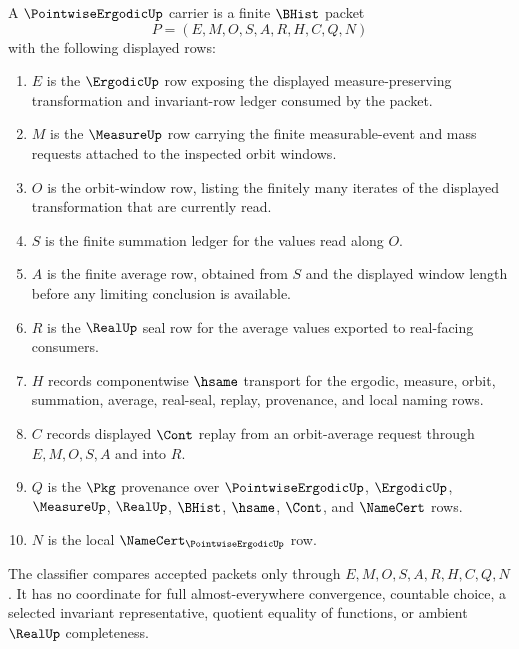 \begin{definition}
\label{def:pointwise-ergodic-carrier}
A $\PointwiseErgodicUp$ carrier is a finite $\BHist$ packet
$$
P=(E,M,O,S,A,R,H,C,Q,N)
$$
with the following displayed rows:
\begin{enumerate}
\item $E$ is the $\ErgodicUp$ row exposing the displayed measure-preserving transformation and invariant-row ledger consumed by the packet.
\item $M$ is the $\MeasureUp$ row carrying the finite measurable-event and mass requests attached to the inspected orbit windows.
\item $O$ is the orbit-window row, listing the finitely many iterates of the displayed transformation that are currently read.
\item $S$ is the finite summation ledger for the values read along $O$.
\item $A$ is the finite average row, obtained from $S$ and the displayed window length before any limiting conclusion is available.
\item $R$ is the $\RealUp$ seal row for the average values exported to real-facing consumers.
\item $H$ records componentwise $\hsame$ transport for the ergodic, measure, orbit, summation, average, real-seal, replay, provenance, and local naming rows.
\item $C$ records displayed $\Cont$ replay from an orbit-average request through $E,M,O,S,A$ and into $R$.
\item $Q$ is the $\Pkg$ provenance over $\PointwiseErgodicUp$, $\ErgodicUp$, $\MeasureUp$, $\RealUp$, $\BHist$, $\hsame$, $\Cont$, and $\NameCert$ rows.
\item $N$ is the local $\NameCert_{\PointwiseErgodicUp}$ row.
\end{enumerate}
The classifier compares accepted packets only through $E,M,O,S,A,R,H,C,Q,N$. It has no coordinate for full almost-everywhere convergence, countable choice, a selected invariant representative, quotient equality of functions, or ambient $\RealUp$ completeness.
\end{definition}

